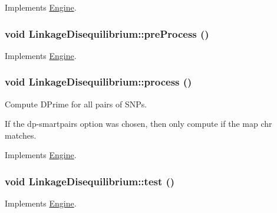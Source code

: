 Implements \hyperlink{classEngine_aaa054d596fb8ced6e3eb4bee208f8c3d}{Engine}.

\hypertarget{classLinkageDisequilibrium_a2f466153298f2c868a78b5573f6c5048}{
\subsubsection[{preProcess}]{\setlength{\rightskip}{0pt plus 5cm}void LinkageDisequilibrium::preProcess ()}}
\label{classLinkageDisequilibrium_a2f466153298f2c868a78b5573f6c5048}


Implements \hyperlink{classEngine_aec7076b8979a13c96eceb362437dc68c}{Engine}.

\hypertarget{classLinkageDisequilibrium_a821abc8314c8e6bddc1dfcdf24bdda09}{
\subsubsection[{process}]{\setlength{\rightskip}{0pt plus 5cm}void LinkageDisequilibrium::process ()}}
\label{classLinkageDisequilibrium_a821abc8314c8e6bddc1dfcdf24bdda09}
Compute DPrime for all pairs of SNPs.

If the dp-\/smartpairs option was chosen, then only compute if the map chr matches. 

Implements \hyperlink{classEngine_a005f8e277c3dea16ea05803fba223db7}{Engine}.

\hypertarget{classLinkageDisequilibrium_a8df37823ab11776642f571e8e8ba7e3b}{
\subsubsection[{test}]{\setlength{\rightskip}{0pt plus 5cm}void LinkageDisequilibrium::test ()}}
\label{classLinkageDisequilibrium_a8df37823ab11776642f571e8e8ba7e3b}


Implements \hyperlink{classEngine_a2927c4a4263809453063ad482c6434a4}{Engine}.



